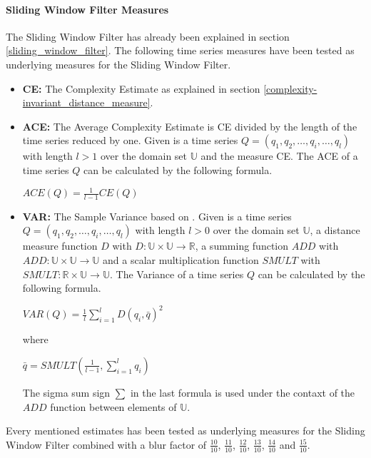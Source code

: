 \paragraph{Sliding Window Filter Measures} \label{sliding_window_filter_measures}
The Sliding Window Filter has already been explained in section \ref{sliding_window_filter}. The following time series
measures have been tested as underlying measures for the Sliding Window Filter.

\begin{itemize}
    \item \textbf{CE:} The Complexity Estimate as explained in section \ref{complexity-invariant_distance_measure}.
    \item \textbf{ACE:} The Average Complexity Estimate is CE divided by the length of the time series reduced by one.
    Given is a time series $Q = (q_1, q_2, \dots, q_i, \dots, q_l)$ with length $l > 1$ over the domain set $\mathbb{U}$
    and the measure CE. The ACE of a time series $Q$ can be calculated by the following formula.
    \begin{center}
        $ACE(Q) = \frac{1}{l - 1}CE(Q)$
    \end{center}
    \item \textbf{VAR:} The Sample Variance based on \cite{chan1983algorithms}. Given is a time series
    $Q = (q_1, q_2, \dots, q_i, \dots, q_l)$ with length $l > 0$ over the domain set $\mathbb{U}$, a distance measure
    function $D$ with $D: \mathbb{U} \times \mathbb{U} \to \mathbb{R}$, a summing function $ADD$ with
    $ADD: \mathbb{U} \times \mathbb{U} \to \mathbb{U}$ and a scalar multiplication function $SMULT$ with
    $SMULT: \mathbb{R} \times \mathbb{U} \to \mathbb{U}$. The Variance of a time series $Q$ can be calculated by the
    following formula.
    \begin{center}
        $VAR(Q) = \frac{1}{l}\sum \limits_{i=1}^{l} D(q_i, \bar{q})^2$
    \end{center}
    where
    \begin{center}
        $\bar{q} = SMULT(\frac{1}{l-1}, \sum \limits_{i=1}^{l} q_i)$
    \end{center}
    The sigma sum sign $\sum$ in the last formula is used under the contaxt of the $ADD$ function between elements of
    $\mathbb{U}$.
\end{itemize}
Every mentioned estimates has been tested as underlying measures for the Sliding Window Filter combined with a blur
factor of $\frac{10}{10}$, $\frac{11}{10}$, $\frac{12}{10}$, $\frac{13}{10}$, $\frac{14}{10}$ and $\frac{15}{10}$.
